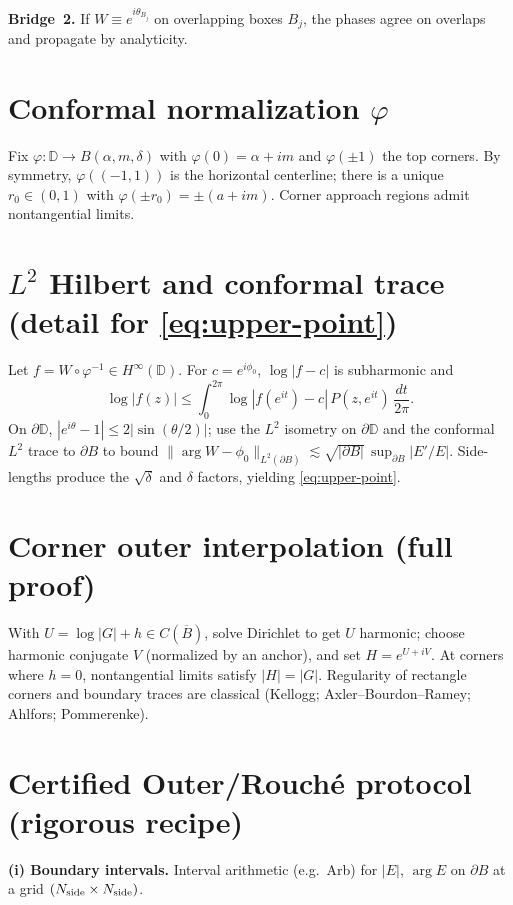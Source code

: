 \documentclass[11pt]{article}
\numberwithin{equation}{section}
\theoremstyle{remark}
\newcommand{\D}{\mathbb{D}}
\begin{document}
\noindent\textbf{Bridge~2.} If $W\equiv e^{i\theta_{B_j}}$ on overlapping boxes $B_j$, the phases agree on overlaps and propagate by analyticity.

\section{Conformal normalization $\varphi$}\label{app:conformal}
Fix $\varphi:\D\to B(\alpha,m,\delta)$ with $\varphi(0)=\alpha+im$ and $\varphi(\pm1)$ the top corners. By symmetry, $\varphi((-1,1))$ is the horizontal centerline; there is a unique $r_0\in(0,1)$ with $\varphi(\pm r_0)=\pm(a+im)$. Corner approach regions admit nontangential limits.

\section{$L^2$ Hilbert and conformal trace (detail for \texorpdfstring{\eqref{eq:upper-point}}{(4.1)})}\label{app:L2}
Let $f=W\circ\varphi^{-1}\in H^\infty(\D)$. For $c=e^{i\phi_0}$, $\log|f-c|$ is subharmonic and
\[
\log|f(z)|\le \int_{0}^{2\pi}\log|f(e^{it})-c|\,P(z,e^{it})\,\frac{dt}{2\pi}.
\]
On $\partial\D$, $|e^{i\theta}-1|\le 2|\sin(\theta/2)|$; use the $L^2$ isometry on $\partial\D$ and the conformal $L^2$ trace to $\partial B$ to bound $\|\arg W-\phi_0\|_{L^2(\partial B)}\lesssim \sqrt{|\partial B|}\,\sup_{\partial B}|E'/E|$. Side-lengths produce the $\sqrt{\delta}$ and $\delta$ factors, yielding \eqref{eq:upper-point}.

\section{Corner outer interpolation (full proof)}\label{app:corner}
With $U=\log|G|+h\in C(\overline B)$, solve Dirichlet to get $U$ harmonic; choose harmonic conjugate $V$ (normalized by an anchor), and set $H=e^{U+iV}$. At corners where $h=0$, nontangential limits satisfy $|H|=|G|$. Regularity of rectangle corners and boundary traces are classical (Kellogg; Axler--Bourdon--Ramey; Ahlfors; Pommerenke).

\section{Certified Outer/Rouch\'e protocol (rigorous recipe)}\label{app:cert}
\textbf{(i) Boundary intervals.} Interval arithmetic (e.g.\ Arb) for $|E|$, $\arg E$ on $\partial B$ at a grid $(N_{\rm side}\times N_{\rm side})$.
\smallskip
\end{document}
